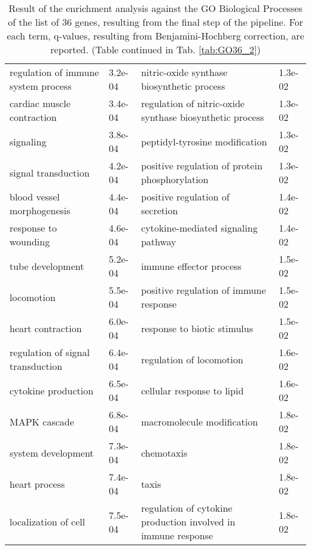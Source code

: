 \documentclass[fleqn,10pt]{SelfArx} %
\begin{document}
\begin{table}[ht]
\begin{tabularx}{\textwidth}{XlXl}
		regulation of immune system process & 3.2e-04 & nitric-oxide synthase biosynthetic process & 1.3e-02 \\ 
		cardiac muscle contraction & 3.4e-04 & regulation of nitric-oxide synthase biosynthetic process & 1.3e-02 \\ 
		signaling & 3.8e-04 & peptidyl-tyrosine modification & 1.3e-02 \\ 
		signal transduction & 4.2e-04 & positive regulation of protein phosphorylation & 1.3e-02 \\ 
		blood vessel morphogenesis & 4.4e-04 & positive regulation of secretion & 1.4e-02 \\ 
		response to wounding & 4.6e-04 & cytokine-mediated signaling pathway & 1.4e-02 \\ 
		tube development & 5.2e-04 & immune effector process & 1.5e-02 \\ 
		locomotion & 5.5e-04 & positive regulation of immune response & 1.5e-02 \\ 
		heart contraction & 6.0e-04 & response to biotic stimulus & 1.5e-02 \\ 
		regulation of signal transduction & 6.4e-04 & regulation of locomotion & 1.6e-02 \\ 
		cytokine production & 6.5e-04 & cellular response to lipid & 1.6e-02 \\ 
		MAPK cascade & 6.8e-04 & macromolecule modification & 1.8e-02 \\ 
		system development & 7.3e-04 & chemotaxis & 1.8e-02 \\
		heart process & 7.4e-04 & taxis & 1.8e-02 \\	
		localization of cell & 7.5e-04 & regulation of cytokine production involved in immune response & 1.8e-02 \\ 
	\end{tabularx}
	\smallskip
	\caption{Result of the enrichment analysis against the GO Biological Processes of the list of 36 genes, resulting from the final step of the pipeline. For each term, q-values, resulting from Benjamini-Hochberg correction, are reported. (Table continued in Tab. \ref{tab:GO36_2})}
	\label{tab:GO36_1}
\end{table}
\end{document}
